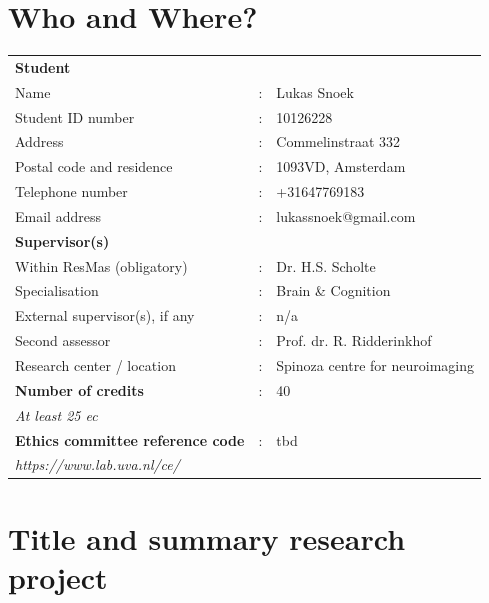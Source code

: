 \documentclass[12pt,a4paper]{article}
\begin{document}
\onehalfspacing

\section{Who and Where?}
\vspace{\baselineskip}

\begin{tabular}{l l l}
\textbf{Student} \\
Name & : &                              Lukas Snoek\\
Student ID number & : &                 10126228 \\
Address & : &                           Commelinstraat 332 \\
Postal code and residence & : &         1093VD, Amsterdam \\
Telephone number & : &                  +31647769183 \\
Email address & : &                     lukassnoek@gmail.com \\[0.5cm]

\textbf{Supervisor(s)} \\
Within ResMas (obligatory) & : &        Dr. H.S. Scholte \\
Specialisation & : &                    Brain \& Cognition \\
External supervisor(s), if any & : &    n/a \\
Second assessor & : &                   Prof. dr. R. Ridderinkhof \\
Research center / location & : &        Spinoza centre for neuroimaging \\[0.5cm]

\textbf{Number of credits} & : &        40 \\
\textit{At least 25 ec} \\[0.5cm]

\textbf{Ethics committee reference code} & : &   tbd \\
\textit{https://www.lab.uva.nl/ce/} \\[0.5cm]

\end{tabular}

\section{Title and summary research project}
\end{document}

